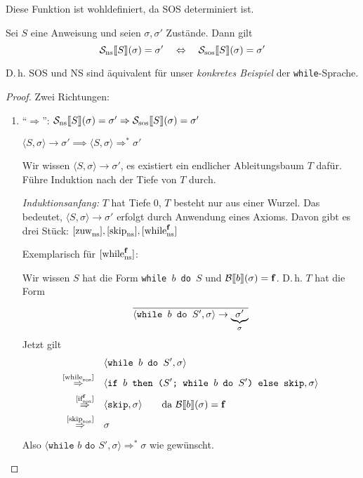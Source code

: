 \begin{lemma}[Determiniertheit]
\begin{definition}
    Diese Funktion ist wohldefiniert, da SOS determiniert ist.
\end{definition}

\begin{theorem}
    Sei $S$ eine Anweisung und seien $\sigma, \sigma'$ Zustände. Dann gilt
    \[
        \mathcal{S_{\text{ns}}}\lsem S \rsem(\sigma) = \sigma'
        \quad\Leftrightarrow\quad
        \mathcal{S_{\text{sos}}}\lsem S \rsem(\sigma) = \sigma'
    \]

    D.\,h. SOS und NS sind äquivalent für unser \emph{konkretes Beispiel} der \texttt{while}-Sprache.
\end{theorem}

\begin{proof}
    Zwei Richtungen:
    \begin{enumerate}
        \item ``$\Rightarrow$'': $\mathcal{S_{\text{ns}}}\lsem S \rsem(\sigma) = \sigma' \Rightarrow \mathcal{S_{\text{sos}}}\lsem S \rsem(\sigma) = \sigma'$

            \dh{} $\langle S, \sigma \rangle \to \sigma' \implies \langle S, \sigma \rangle \Rightarrow^* \sigma'$

            Wir wissen $\langle S, \sigma \rangle \to \sigma'$, \dh{} es existiert ein endlicher Ableitungsbaum $T$ dafür. Führe Induktion nach der Tiefe von $T$ durch.

            \par\medskip
            \emph{Induktionsanfang:} $T$ hat Tiefe 0, \dh{} $T$ besteht nur aus einer Wurzel. Das bedeutet, $\langle S, \sigma \rangle \to \sigma'$ erfolgt durch Anwendung eines Axioms. Davon gibt es drei Stück: $\infruleNs{zuw}, \infruleNs{skip}, \infruleNs[\false]{while}$

            Exemplarisch für $\infruleNs[\false]{while}$:

            Wir wissen $S$ hat die Form \texttt{while $b$ do $S$} und $\Bsem{b}(\sigma) = \false$. D.\,h. $T$ hat die Form
            \[
                \frac{}{
                    \strans{\texttt{while $b$ do $S'$}}{\sigma}{\underbrace{\sigma'}_{\sigma}}
                }
            \]
            Jetzt gilt
            \begin{align*}
                & \langle \texttt{while $b$ do $S'$}, \sigma \rangle \\
                \overset{\infruleSos{while}}{\Rightarrow} \quad & \langle \texttt{if $b$ then ($S'$; while $b$ do $S'$) else skip} , \sigma \rangle \\
                \overset{\infruleSos[\false]{if}}{\Rightarrow} \quad & \langle \texttt{skip}, \sigma \rangle \quad\quad \text{da } \Bsem{b}(\sigma) = \false \\
                \overset{\infruleSos{skip}}{\Rightarrow} \quad & \sigma \\
            \end{align*}
            Also $\langle \texttt{while $b$ do $S'$}, \sigma \rangle \Rightarrow^* \sigma$ wie gewünscht.


\end{enumerate}
\end{proof}
\end{lemma}
